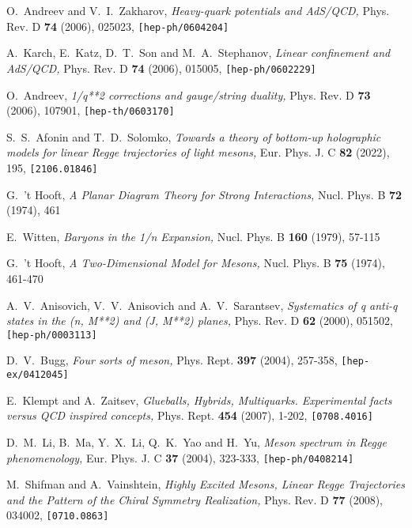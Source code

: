 \documentclass[a4paper,11pt]{article}
\begin{document}
\begin{thebibliography}{99}

  O.~Andreev and V.~I.~Zakharov,
  \textit{Heavy-quark potentials and AdS/QCD,}
  Phys. Rev. D \textbf{74} (2006), 025023,
  \texttt{[hep-ph/0604204]}

  A.~Karch, E.~Katz, D.~T.~Son and M.~A.~Stephanov,
  \textit{Linear confinement and AdS/QCD,}
  Phys. Rev. D \textbf{74} (2006), 015005,
  \texttt{[hep-ph/0602229]}

  O.~Andreev,
  \textit{1/q**2 corrections and gauge/string duality,}
  Phys. Rev. D \textbf{73} (2006), 107901,
  \texttt{[hep-th/0603170]}

  S.~S.~Afonin and T.~D.~Solomko,
  \textit{Towards a theory of bottom-up holographic models for linear Regge trajectories of light mesons,}
  Eur. Phys. J. C \textbf{82} (2022), 195,
  \texttt{[2106.01846]}

  G.~'t Hooft,
  \textit{A Planar Diagram Theory for Strong Interactions,}
  Nucl. Phys. B \textbf{72} (1974), 461

  E.~Witten,
  \textit{Baryons in the 1/n Expansion,}
  Nucl. Phys. B \textbf{160} (1979), 57-115

  G.~'t Hooft,
  \textit{A Two-Dimensional Model for Mesons,}
  Nucl. Phys. B \textbf{75} (1974), 461-470

  A.~V.~Anisovich, V.~V.~Anisovich and A.~V.~Sarantsev,
  \textit{Systematics of q anti-q states in the (n, M**2) and (J, M**2) planes,}
  Phys. Rev. D \textbf{62} (2000), 051502,
  \texttt{[hep-ph/0003113]}

  D.~V.~Bugg,
  \textit{Four sorts of meson,}
  Phys. Rept. \textbf{397} (2004), 257-358,
  \texttt{[hep-ex/0412045]}

  E.~Klempt and A.~Zaitsev,
  \textit{Glueballs, Hybrids, Multiquarks. Experimental facts versus QCD inspired concepts,}
  Phys. Rept. \textbf{454} (2007), 1-202,
  \texttt{[0708.4016]}

  D.~M.~Li, B.~Ma, Y.~X.~Li, Q.~K.~Yao and H.~Yu,
  \textit{Meson spectrum in Regge phenomenology,}
  Eur. Phys. J. C \textbf{37} (2004), 323-333,
  \texttt{[hep-ph/0408214]}

  M.~Shifman and A.~Vainshtein,
  \textit{Highly Excited Mesons, Linear Regge Trajectories and the Pattern of the Chiral Symmetry Realization,}
  Phys. Rev. D \textbf{77} (2008), 034002,
  \texttt{[0710.0863]}


\end{thebibliography}
\end{document}
